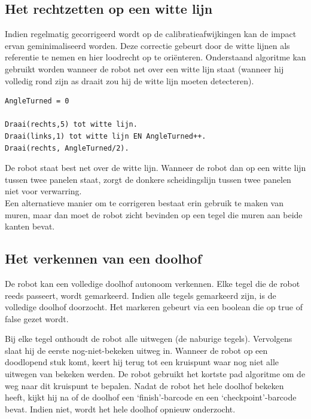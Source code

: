 \documentclass[tt3]{penoverslag}
\begin{document}
\subsection{Het rechtzetten op een witte lijn} %
\label{ssec:algoWitteL}
Indien regelmatig gecorrigeerd wordt op de calibratieafwijkingen kan de impact ervan geminimaliseerd worden. Deze correctie gebeurt door de witte lijnen als referentie te nemen en hier loodrecht op te ori\"enteren.
Onderstaand algoritme kan gebruikt worden wanneer de robot net over een witte lijn staat (wanneer hij volledig rond zijn as draait zou hij de witte lijn moeten detecteren).

\lstset{frame=single, caption=Witte Lijn algoritme (pseudocode),
		label=code:algoWitteL, numbers=left, numberstyle=\footnotesize,
		basicstyle=\sffamily, numbersep=5pt}
\begin{lstlisting}
AngleTurned = 0

Draai(rechts,5) tot witte lijn.
Draai(links,1) tot witte lijn EN AngleTurned++.
Draai(rechts, AngleTurned/2).
\end{lstlisting}

De robot staat best net over de witte lijn. Wanneer de robot dan op een witte lijn tussen twee panelen staat, zorgt de donkere scheidingslijn tussen twee panelen niet voor verwarring.\\

Een alternatieve manier om te corrigeren bestaat erin gebruik te maken van muren, maar dan moet de robot zicht bevinden op een tegel die muren aan beide kanten bevat.


\subsection{Het verkennen van een doolhof} %
\label{ssec:algoOnderzDoolhof}

De robot kan een volledige doolhof autonoom verkennen. Elke tegel die de robot reeds passeert, wordt gemarkeerd. Indien alle tegels gemarkeerd zijn, is de volledige doolhof doorzocht. Het markeren gebeurt via een boolean die op true of false gezet wordt.

Bij elke tegel onthoudt de robot alle uitwegen (de naburige tegels). Vervolgens slaat hij de eerste nog-niet-bekeken uitweg in. Wanneer de robot op een doodlopend stuk komt, keert hij terug tot een kruispunt waar nog niet alle uitwegen van bekeken werden. De robot gebruikt het kortste pad algoritme om de weg naar dit kruispunt te bepalen.
Nadat de robot het hele doolhof bekeken heeft, kijkt hij na of de doolhof een `finish'-barcode en een `checkpoint'-barcode bevat. Indien niet, wordt het hele doolhof opnieuw onderzocht.\\
\end{document}
